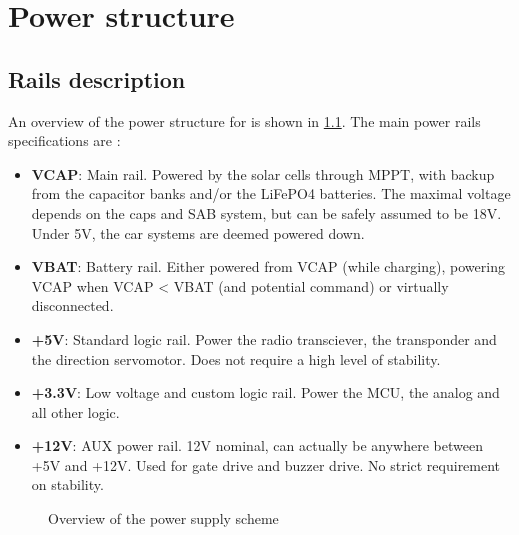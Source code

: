 \chapter{Power structure}
\section{Rails description}
An overview of the power structure for \theproject is shown in \cref{fig-power-overall}.
The main power rails specifications are :
\begin{itemize}
    \item \textbf{VCAP}: Main rail. Powered by the solar cells through MPPT, with backup from the capacitor banks and/or the LiFePO4 batteries.
    The maximal voltage depends on the caps and SAB system, but can be safely assumed to be 18V. Under 5V, the car systems are deemed powered down.
    \item \textbf{VBAT}: Battery rail. Either powered from VCAP (while charging), powering VCAP when VCAP < VBAT (and potential command) or virtually disconnected.
    \item \textbf{+5V}: Standard logic rail. Power the radio transciever, the transponder and the direction servomotor. Does not require a high level of stability.
    \item \textbf{+3.3V}: Low voltage and custom logic rail. Power the MCU, the analog and all other logic.
    \item \textbf{+12V}: AUX power rail. 12V nominal, can actually be anywhere between +5V and +12V. Used for gate drive and buzzer drive. No strict requirement on stability.
\end{itemize}
\begin{landscape}
    \begin{figure}
        \centering
        \def\svgwidth{\linewidth}
        
        \caption{Overview of the power supply scheme}
        \label{fig-power-overall}
    \end{figure}
\end{landscape}
